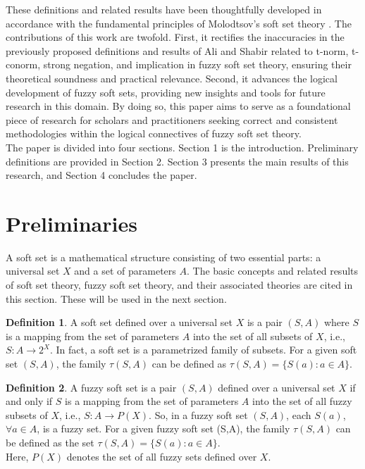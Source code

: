 \documentclass{article}
\theoremstyle{definition}
\newtheorem{definition}{Definition}[section]
\begin{document}
These definitions and related results have been thoughtfully developed in accordance with the fundamental principles of Molodtsov's soft set theory \cite{2,3,10,12}. The contributions of this work are twofold. First, it rectifies the inaccuracies in the previously proposed definitions and results of Ali and Shabir \cite{6} related to t-norm, t-conorm, strong negation, and implication in fuzzy soft set theory, ensuring their theoretical soundness and practical relevance. Second, it advances the logical development of fuzzy soft sets, providing new insights and tools for future research in this domain. By doing so, this paper aims to serve as a foundational piece of research for scholars and practitioners seeking correct and consistent methodologies within the logical connectives of fuzzy soft set theory.\\

The paper is divided into four sections. Section 1 is the introduction. Preliminary definitions are provided in Section 2. Section 3 presents the main results of this research, and Section 4 concludes the paper.\\

\section{Preliminaries}
A soft set is a mathematical structure consisting of two essential parts: a universal set $X$ and a set of parameters $A$. The basic concepts and related results of soft set theory, fuzzy soft set theory, and their associated theories are cited in this section. These will be used in the next section.\\

\begin{definition}\cite{1, 2,3}
A soft set defined over a universal set $X$ is a pair $(S,A)$ where $S$ is a mapping from the set of parameters $A$ into the set of all subsets of $X$, i.e., $S : A \to 2^X$. In fact, a soft set is a parametrized family of subsets. For a given soft set $(S,A)$, the family $\tau(S,A)$ can be defined as $\tau(S,A)=\{S(a): a \in A\}$. \\
    
\end{definition}

\begin{definition}\cite{10}
    A fuzzy soft set is a pair $(S,A)$ defined over a universal set $X$ if and only if $S$ is a mapping from the set of parameters $A$ into the set of all fuzzy subsets of $X$, i.e., $S : A\to P(X)$. So, in a fuzzy soft set $(S, A)$, each $S(a)$, $\forall a \in A$, is a fuzzy set. For a given fuzzy soft set (S,A), the family $\tau (S,A)$ can be defined as the set $\tau (S,A)=\{S(a): a\in A \}$.\\

    Here, $P(X)$ denotes the set of all fuzzy sets defined over  $X$.\\
\end{definition}
\end{document}
